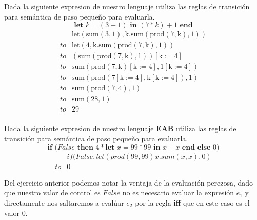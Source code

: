    \bigskip

    \begin{exercise}
        Dada la siguiente expresion de nuestro lenguaje  utiliza las reglas de transición para semántica de paso pequeño para evaluarla.
        \[
            \textbf{let } k = (3 + 1) \textbf{ in } (7 * k) + 1 \textbf{ end} 
        \]
        \[
            \begin{array}{cl}
                &\text{let}(\text{sum}(3,1),\text{k}.\text{sum}(\text{prod}(7,\text{k}),1))\\
                to&\text{let}(4,\text{k}.\text{sum}(\text{prod}(7,\text{k}),1))\\
                to&(\text{sum}(\text{prod}(7,\text{k}),1))[\text{k}:=4]\\
                to&\text{sum}(\text{prod}(7,\text{k})[\text{k}:=4],1[\text{k}:=4])\\
                to&\text{sum}(\text{prod}(7[\text{k}:=4],\text{k}[\text{k}:=4]),1)\\
                to&\text{sum}(\text{prod}(7,4),1)\\
                to&\text{sum}(28,1)\\
                to&29\\
                

            \end{array}
        \]
        
    \end{exercise}

    \bigskip

    \begin{exercise}
        Dada la siguiente expresion de nuestro lenguaje \textbf{EAB} utiliza las reglas de transición para semántica de paso pequeño para evaluarla.
        \[
            \textbf{if (} False \textbf{ then } 4 * \textbf{let } x = 99 * 99 \textbf{ in } x + x \textbf{ end} \textbf{ else } 0 \textbf{)}
        \] 
        \[
            \begin{array}{cl}
                &if(False,let(prod(99,99)x.sum(x,x),0)\\
                to&0

            \end{array}
        \]
    \end{exercise}

    Del ejercicio anterior podemos notar la ventaja de la evaluación perezosa, dado que nuestro valor de control es $False$ no es necesario evaluar la expresión $e_1$ y directamente nos saltaremos a evalúar $e_2$ por la regla \textbf{iff} que en este caso es el valor 0.\\
    

